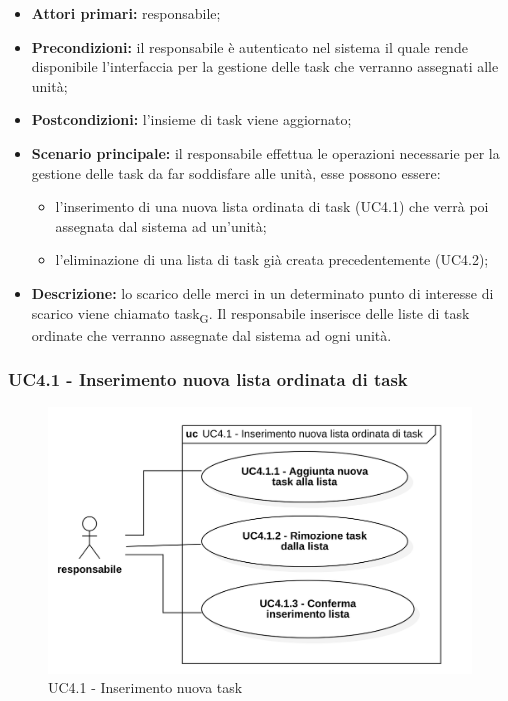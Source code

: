 \begin{itemize}
	\item 	\textbf{Attori primari:} responsabile;
	\item 	\textbf{Precondizioni:} il responsabile è autenticato nel sistema il quale rende disponibile l'interfaccia per la gestione delle task che verranno assegnati alle unità;
	\item 	\textbf{Postcondizioni:} l'insieme di task viene aggiornato;
	\item 	\textbf{Scenario principale:} il responsabile effettua le operazioni necessarie per la gestione delle task da far soddisfare alle unità, esse possono essere:
	\begin{itemize}
		\item l'inserimento di una nuova lista ordinata di task (UC4.1) che verrà poi assegnata dal sistema ad un'unità;
		\item l'eliminazione di una lista di task già creata precedentemente (UC4.2);
	\end{itemize}
	\item 	\textbf{Descrizione:} lo scarico delle merci in un determinato punto di interesse di scarico viene chiamato task\textsubscript{G}. Il responsabile inserisce delle liste di task ordinate che verranno assegnate dal sistema ad ogni unità. 

\end{itemize}

\subsubsection{UC4.1 - Inserimento nuova lista ordinata di task}

\begin{figure}[H]
	\centering
	\includegraphics[scale=0.52]{res/images/uc4-1.png}
	\caption{UC4.1 - Inserimento nuova task}
\end{figure}

